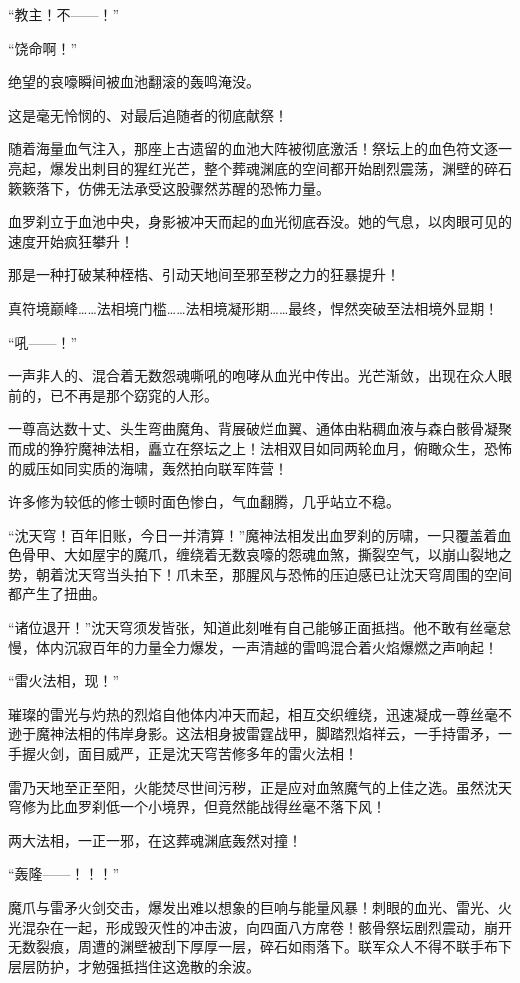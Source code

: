 “教主！不——！”

“饶命啊！”

绝望的哀嚎瞬间被血池翻滚的轰鸣淹没。

这是毫无怜悯的、对最后追随者的彻底献祭！

随着海量血气注入，那座上古遗留的血池大阵被彻底激活！祭坛上的血色符文逐一亮起，爆发出刺目的猩红光芒，整个葬魂渊底的空间都开始剧烈震荡，渊壁的碎石簌簌落下，仿佛无法承受这股骤然苏醒的恐怖力量。

血罗刹立于血池中央，身影被冲天而起的血光彻底吞没。她的气息，以肉眼可见的速度开始疯狂攀升！

那是一种打破某种桎梏、引动天地间至邪至秽之力的狂暴提升！

真符境巅峰……法相境门槛……法相境凝形期……最终，悍然突破至法相境外显期！

“吼——！”

一声非人的、混合着无数怨魂嘶吼的咆哮从血光中传出。光芒渐敛，出现在众人眼前的，已不再是那个窈窕的人形。

一尊高达数十丈、头生弯曲魔角、背展破烂血翼、通体由粘稠血液与森白骸骨凝聚而成的狰狞魔神法相，矗立在祭坛之上！法相双目如同两轮血月，俯瞰众生，恐怖的威压如同实质的海啸，轰然拍向联军阵营！

许多修为较低的修士顿时面色惨白，气血翻腾，几乎站立不稳。

“沈天穹！百年旧账，今日一并清算！”魔神法相发出血罗刹的厉啸，一只覆盖着血色骨甲、大如屋宇的魔爪，缠绕着无数哀嚎的怨魂血煞，撕裂空气，以崩山裂地之势，朝着沈天穹当头拍下！爪未至，那腥风与恐怖的压迫感已让沈天穹周围的空间都产生了扭曲。

“诸位退开！”沈天穹须发皆张，知道此刻唯有自己能够正面抵挡。他不敢有丝毫怠慢，体内沉寂百年的力量全力爆发，一声清越的雷鸣混合着火焰爆燃之声响起！

“雷火法相，现！”

璀璨的雷光与灼热的烈焰自他体内冲天而起，相互交织缠绕，迅速凝成一尊丝毫不逊于魔神法相的伟岸身影。这法相身披雷霆战甲，脚踏烈焰祥云，一手持雷矛，一手握火剑，面目威严，正是沈天穹苦修多年的雷火法相！

雷乃天地至正至阳，火能焚尽世间污秽，正是应对血煞魔气的上佳之选。虽然沈天穹修为比血罗刹低一个小境界，但竟然能战得丝毫不落下风！

两大法相，一正一邪，在这葬魂渊底轰然对撞！

“轰隆——！！！”

魔爪与雷矛火剑交击，爆发出难以想象的巨响与能量风暴！刺眼的血光、雷光、火光混杂在一起，形成毁灭性的冲击波，向四面八方席卷！骸骨祭坛剧烈震动，崩开无数裂痕，周遭的渊壁被刮下厚厚一层，碎石如雨落下。联军众人不得不联手布下层层防护，才勉强抵挡住这逸散的余波。


